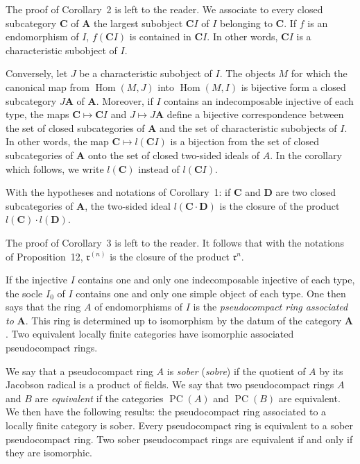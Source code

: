 The proof of Corollary~2 is left to the reader. We associate to every
closed subcategory $\mathbf{C}$ of $\mathbf{A}$ the largest subobject
$\mathbf{C}I$ of $I$ belonging to $\mathbf{C}$. If $f$ is an
endomorphism of $I$, $f(\mathbf{C}I)$ is contained in $\mathbf{C}I$. In
other words, $\mathbf{C}I$ is a characteristic subobject of $I$.

Conversely, let $J$ be a characteristic subobject of $I$. The objects
$M$ for which the canonical map from $\operatorname{Hom}(M,J)$ into
$\operatorname{Hom}(M,I)$ is bijective form a closed subcategory
$J\mathbf{A}$ of $\mathbf{A}$. Moreover, if $I$ contains an
indecomposable injective of each type, the maps
$\mathbf{C}\mapsto\mathbf{C}I$ and $J\mapsto J\mathbf{A}$ define a
bijective correspondence between the set of closed subcategories of
$\mathbf{A}$ and the set of characteristic subobjects of $I$. In other
words, the map $\mathbf{C}\mapsto l(\mathbf{C}I)$ is a bijection from
the set of closed subcategories of $\mathbf{A}$ onto the set of closed
two-sided ideals of $A$. In the corollary which follows, we write
$l(\mathbf{C})$ instead of $l(\mathbf{C}I)$.

\begin{corollary}
With the hypotheses and notations of Corollary~1: if $\mathbf{C}$ and
$\mathbf{D}$ are two closed subcategories of $\mathbf{A}$, the
two-sided ideal $l(\mathbf{C}\cdot\mathbf{D})$ is the closure of the
product $l(\mathbf{C})\cdot l(\mathbf{D})$.
\end{corollary}

The proof of Corollary~3 is left to the reader. It follows that with
the notations of Proposition~12, $\mathfrak{r}^{(n)}$ is the closure of
the product $\mathfrak{r}^n$.

If the injective $I$ contains one and only one indecomposable injective
of each type, the socle $I_0$ of $I$ contains one and only one simple
object of each type. One then says that the ring $A$ of endomorphisms
of $I$ is the \emph{pseudocompact ring associated to} $\mathbf{A}$.
This ring is determined up to isomorphism by the datum of the category
$\mathbf{A}$. Two equivalent locally finite categories have isomorphic
associated pseudocompact rings.

We say that a pseudocompact ring $A$ is \emph{sober} (\emph{sobre}) if
the quotient of $A$ by its Jacobson radical is a product of fields. We
say that two pseudocompact rings $A$ and $B$ are \emph{equivalent} if
the categories $\operatorname{PC}(A)$ and $\operatorname{PC}(B)$ are
equivalent. We then have the following results: the pseudocompact ring
associated to a locally finite category is sober. Every pseudocompact
ring is equivalent to a sober pseudocompact ring. Two sober
pseudocompact rings are equivalent if and only if they are isomorphic.

